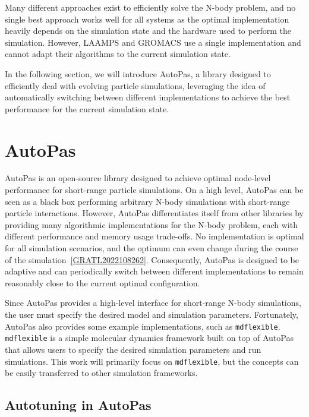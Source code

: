 Many different approaches exist to efficiently solve the N-body problem, and no single best approach works well for all systems as the optimal implementation heavily depends on the simulation state and the hardware used to perform the simulation. However, LAAMPS and GROMACS use a single implementation and cannot adapt their algorithms to the current simulation state.

In the following section, we will introduce AutoPas, a library designed to efficiently deal with evolving particle simulations, leveraging the idea of automatically switching between different implementations to achieve the best performance for the current simulation state.

\section{AutoPas}

AutoPas is an open-source library designed to achieve optimal node-level performance for short-range particle simulations. On a high level, AutoPas can be seen as a black box performing arbitrary N-body simulations with short-range particle interactions. However, AutoPas differentiates itself from other libraries by providing many algorithmic implementations for the N-body problem, each with different performance and memory usage trade-offs. No implementation is optimal for all simulation scenarios, and the optimum can even change during the course of the simulation~\autoref{GRATL2022108262}. Consequently, AutoPas is designed to be adaptive and can periodically switch between different implementations to remain reasonably close to the current optimal configuration.

Since AutoPas provides a high-level interface for short-range N-body simulations, the user must specify the desired model and simulation parameters. Fortunately, AutoPas also provides some example implementations, such as \texttt{\gls{mdflexible}}. \texttt{\gls{mdflexible}} is a simple molecular dynamics framework built on top of AutoPas that allows users to specify the desired simulation parameters and run simulations. This work will primarily focus on \texttt{\gls{mdflexible}}, but the concepts can be easily transferred to other simulation frameworks.

\subsection{Autotuning in AutoPas}

